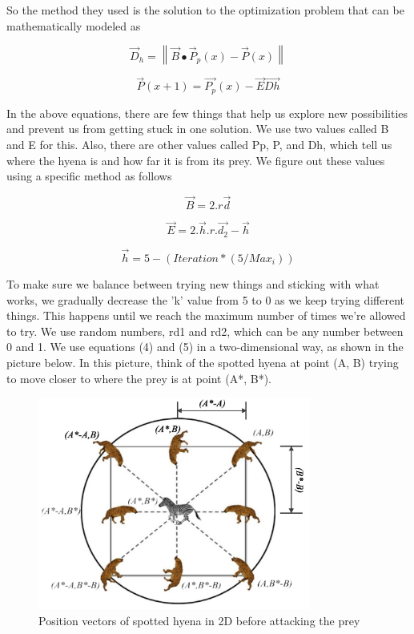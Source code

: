 \documentclass[12pt]{article}
\begin{document}
So the method they used is the solution to the optimization problem that can be mathematically modeled as 

\begin{equation}
    \overrightarrow{D}_h = \left\| \overrightarrow{B}\bullet \overrightarrow{P}_p(x)-\overrightarrow{P}(x) \right\|
\end{equation}


\begin{equation}
    \overrightarrow{P}(x + 1) = \overrightarrow{P_p}(x) -  \overrightarrow{E} \overrightarrow{Dh}
\end{equation}




In the above equations, there are few things that help us explore new possibilities and prevent us from getting stuck in one solution. We use two values called B and E for this. Also, there are other values called Pp, P, and Dh, which tell us where the hyena is and how far it is from its prey. We figure out these values using a specific method as follows

\begin{equation}
    \overrightarrow{B} = 2.r\overrightarrow{d}
\end{equation}

\begin{equation}
    \overrightarrow{E} = 2.\overrightarrow{h}.r.\overrightarrow{d_2} - \overrightarrow{h}
\end{equation}


\begin{equation}
    \overrightarrow{h} = 5 - (Iteration*(5/Max_i))
\end{equation}

To make sure we balance between trying new things and sticking with what works, we gradually decrease the 'k' value from 5 to 0 as we keep trying different things. This happens until we reach the maximum number of times we're allowed to try. We use random numbers, rd1 and rd2, which can be any number between 0 and 1. We use equations (4) and (5) in a two-dimensional way, as shown in the picture below. In this picture, think of the spotted hyena at point (A, B) trying to move closer to where the prey is at point (A*, B*).
\begin{figure}
  \centering
      \includegraphics[width=0.8\textwidth]{F1_SHO_circling.jpg}
  \caption{Position vectors of spotted hyena in 2D before attacking the prey}
\end{figure}
\end{document}
